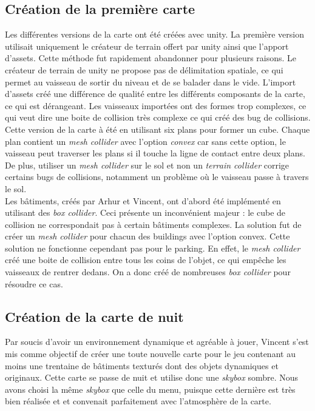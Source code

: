 \documentclass[12pt, titlepage]{article}
\begin{document}
\begin{spacing}{1.5}
\subsection{Création de la première carte}

Les différentes versions de la carte ont été créées avec unity. La première version utilisait uniquement le créateur de terrain offert par unity ainsi que l'apport d'assets. Cette méthode fut rapidement abandonner pour plusieurs raisons. Le créateur de terrain de unity ne propose pas de délimitation spatiale, ce qui permet au vaisseau de sortir du niveau et de se balader dans le vide. L'import d'assets créé une différence de qualité entre les différents composants de la carte, ce qui est dérangeant. Les vaisseaux importées ont des formes trop complexes, ce qui veut dire une boite de collision très complexe ce qui créé des bug de collisions. \\

Cette version de la carte à été en utilisant six plans pour former un cube. Chaque plan contient un \textit{mesh collider} avec l’option \textit{convex} car sans cette option, le vaisseau peut traverser les plans si il touche la ligne de contact entre deux plans. De plus, utiliser un \textit{mesh collider} sur le sol et non un \textit{terrain collider} corrige certains bugs de collisions, notamment un problème où le vaisseau passe à travers le sol.\\

Les bâtiments, créés par Arhur et Vincent, ont d'abord été implémenté en utilisant des \textit{box collider}. Ceci présente un inconvénient majeur : le cube de collision ne correspondait pas à certain bâtiments complexes. La solution fut de créer un \textit{mesh collider} pour chacun des buildings avec l'option convex. Cette solution ne fonctionne cependant pas pour le parking. En effet, le \textit{mesh collider} créé une boite de collision entre tous les coins de l'objet, ce qui empêche les vaisseaux de rentrer dedans. On a donc créé de nombreuses \textit{box collider} pour résoudre ce cas.

\subsection{Création de la carte de nuit}

Par soucis d'avoir un environnement dynamique et agréable à jouer, Vincent s’est mis comme objectif de créer une toute nouvelle carte pour le jeu contenant au moins une trentaine de bâtiments texturés dont des objets dynamiques et originaux. Cette carte se passe de nuit et utilise donc une \textit{skybox} sombre. Nous avons choisi la même \textit{skybox} que celle du menu, puisque cette dernière est très bien réalisée et et convenait parfaitement avec l'atmosphère de la carte.\\


\end{spacing}
\end{document}
